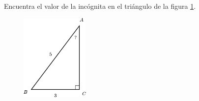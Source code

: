 Encuentra el valor de la incógnita en el triángulo de la figura \ref{fig:angle_functrig_02}.
\begin{figure}[H]
    \begin{center}
        \includegraphics[width=0.3\textwidth]{../images/angle_functrig_02.png}
    \end{center}
    \caption{}
    \label{fig:angle_functrig_02}
\end{figure}